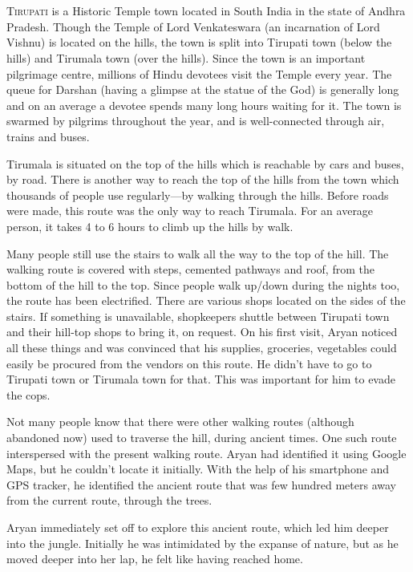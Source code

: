 \chapter{}

\lettrine{T}{irupati} is a Historic Temple town located in South India in the state of Andhra
Pradesh. Though the Temple of Lord Venkateswara (an incarnation of Lord Vishnu)
is located on the hills, the town is split into Tirupati town (below the hills)
and Tirumala town (over the hills). Since the town is an important pilgrimage
centre, millions of Hindu devotees visit the Temple every year. The queue for
Darshan (having a glimpse at the statue of the God) is generally long and on an
average a devotee spends many long hours waiting for it. The town is swarmed by
pilgrims throughout the year, and is well-connected through air, trains and
buses.

Tirumala is situated on the top of the hills which is reachable by cars and
buses, by road. There is another way to reach the top of the hills from the town
which thousands of people use regularly—by walking through the hills. Before
roads were made, this route was the only way to reach Tirumala. For an average
person, it takes 4 to 6 hours to climb up the hills by walk.

Many people still use the stairs to walk all the way to the top of the hill. The
walking route is covered with steps, cemented pathways and roof, from the bottom
of the hill to the top. Since people walk up/down during the nights too, the
route has been electrified. There are various shops located on the sides of the
stairs. If something is unavailable, shopkeepers shuttle between Tirupati town
and their hill-top shops to bring it, on request. On his first visit, Aryan
noticed all these things and was convinced that his supplies, groceries,
vegetables could easily be procured from the vendors on this route. He didn't
have to go to Tirupati town or Tirumala town for that. This was important for
him to evade the cops.

Not many people know that there were other walking routes (although abandoned
now) used to traverse the hill, during ancient times. One such route
interspersed with the present walking route. Aryan had identified it using
Google Maps, but he couldn't locate it initially. With the help of his
smartphone and GPS tracker, he identified the ancient route that was few hundred
meters away from the current route, through the trees.

Aryan immediately set off to explore this ancient route, which led him deeper
into the jungle. Initially he was intimidated by the expanse of nature, but as
he moved deeper into her lap, he felt like having reached home.

